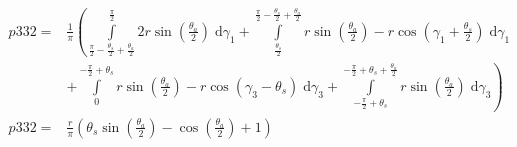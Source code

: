 \begin{align}
    p332 =&\frac{1}{\pi} \left(\int\limits_{\frac{\pi}{2} - \frac{\theta_{s}}{2} + \frac{\theta_{a}}{2}}^{\frac{\pi}{2}}2 r \sin{\left (\frac{\theta_{a}}{2} \right )}\;\mathrm{d}\gamma_{1}+\int\limits_{\frac{\theta_{s}}{2}}^{\frac{\pi}{2} - \frac{\theta_{s}}{2} + \frac{\theta_{a}}{2}}r \sin{\left (\frac{\theta_{a}}{2} \right )} - r \cos{\left (\gamma_{1} + \frac{\theta_{s}}{2} \right )}\;\mathrm{d}\gamma_{1}\right.\\
 &\left.+\int\limits_{0}^{- \frac{\pi}{2} + \theta_{s}}r \sin{\left (\frac{\theta_{a}}{2} \right )} - r \cos{\left (\gamma_{3} - \theta_{s} \right )}\;\mathrm{d}\gamma_{3}+\int\limits_{- \frac{\pi}{2} + \theta_{s}}^{- \frac{\pi}{2} + \theta_{s} + \frac{\theta_{a}}{2}}r \sin{\left (\frac{\theta_{a}}{2} \right )}\;\mathrm{d}\gamma_{3}\right)\\
    p332 =& \frac{r}{\pi} \left(\theta_{s} \sin{\left (\frac{\theta_{a}}{2} \right )} - \cos{\left (\frac{\theta_{a}}{2} \right )} + 1\right)
\end{align}